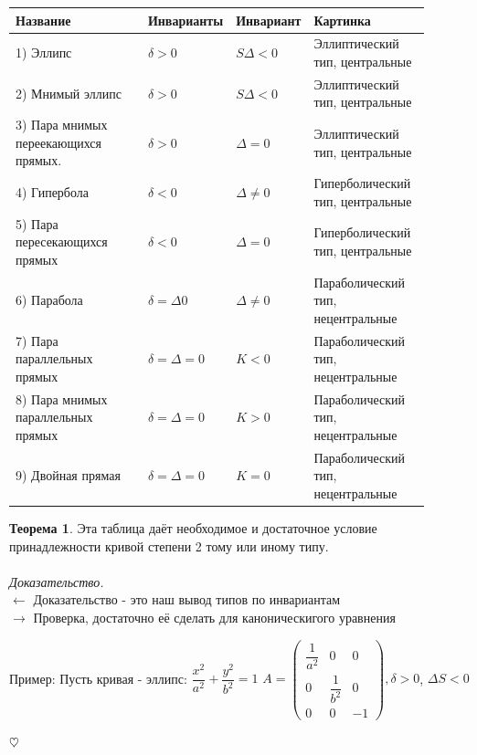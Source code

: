 \documentclass{article}
\theoremstyle{definition}
\newtheorem{theorem}{Теорема}[section]
\newenvironment{ourproof}{\textit{\\ Доказательство.\\ }}{$\hfill \heartsuit$}
\begin{document}
\begin{tabular}{p{0.4\linewidth}|p{0.1\linewidth}|p{0.1\linewidth}|p{0.3\linewidth}}
     Название        & Инварианты & Инвариант & Картинка\\\hline
     1) Эллипс & $\delta > 0$ & $S \Delta < 0$ &  Эллиптический тип, центральные\\\hline
     2) Мнимый эллипс & $\delta > 0$ & $S \Delta < 0$ & Эллиптический тип, центральные\\\hline
     3) Пара  мнимых переекающихся прямых. & $\delta > 0$ & $\Delta = 0$ & Эллиптический тип, центральные \\\hline
     4) Гипербола & $\delta < 0$ & $\Delta \neq 0$ & Гиперболический тип, центральные\\\hline
     5) Пара пересекающихся прямых & $\delta < 0$ & $\Delta = 0$ & Гиперболический тип, центральные\\\hline
     6) Парабола & $\delta = \Delta 0$ & $\Delta \neq 0$ & Параболический тип, нецентральные\\\hline
     7) Пара параллельных прямых & $\delta = \Delta = 0$ & $K < 0$ & Параболический тип, нецентральные\\\hline
     8) Пара мнимых параллельных прямых & $\delta = \Delta = 0$ & $K > 0$ & Параболический тип, нецентральные\\\hline
     9) Двойная прямая & $\delta = \Delta = 0$ & $K = 0$ & Параболический тип, нецентральные \\\hline
\end{tabular}

\begin{theorem}
Эта таблица даёт необходимое и достаточное условие принадлежности кривой степени 2 тому или иному типу.
\\
\begin{ourproof}
$\leftarrow$ Доказательство - это наш вывод типов по инвариантам
\\$\rightarrow$ Проверка, достаточно её сделать для каноническигого уравнения

Пример: Пусть кривая - эллипс: $\dfrac{x^2}{a^2} + \dfrac{y^2}{b^2} = 1$
$A =  \begin{pmatrix}
\dfrac{1}{a^2} & 0 & 0 \\
0 & \dfrac{1}{b^2} & 0 \\
0 & 0 & -1
\end{pmatrix}, \delta >0$, $\Delta S < 0$

\end{ourproof}
\end{theorem}
\end{document}
